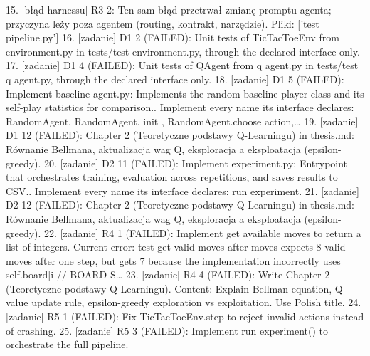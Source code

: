 \documentclass[conference]{IEEEtran}
\begin{document}
15. [błąd harnessu] R3 2: Ten sam błąd przetrwał zmianę promptu agenta; przyczyna leży poza agentem (routing, kontrakt, narzędzie). Pliki: ['test pipeline.py']
16. [zadanie] D1 2 (FAILED): Unit tests of TicTacToeEnv from environment.py in tests/test environment.py, through the declared interface only.
17. [zadanie] D1 4 (FAILED): Unit tests of QAgent from q agent.py in tests/test q agent.py, through the declared interface only.
18. [zadanie] D1 5 (FAILED): Implement baseline agent.py: Implements the random baseline player class and its self-play statistics for comparison.. Implement every name its interface declares: RandomAgent, RandomAgent. init , RandomAgent.choose action,…
19. [zadanie] D1 12 (FAILED): Chapter 2 (Teoretyczne podstawy Q-Learningu) in thesis.md: Równanie Bellmana, aktualizacja wag Q, eksploracja a eksploatacja (epsilon-greedy).
20. [zadanie] D2 11 (FAILED): Implement experiment.py: Entrypoint that orchestrates training, evaluation across repetitions, and saves results to CSV.. Implement every name its interface declares: run experiment.
21. [zadanie] D2 12 (FAILED): Chapter 2 (Teoretyczne podstawy Q-Learningu) in thesis.md: Równanie Bellmana, aktualizacja wag Q, eksploracja a eksploatacja (epsilon-greedy).
22. [zadanie] R4 1 (FAILED): Implement get available moves to return a list of integers. Current error: test get valid moves after moves expects 8 valid moves after one step, but gets 7 because the implementation incorrectly uses self.board[i // BOARD S…
23. [zadanie] R4 4 (FAILED): Write Chapter 2 (Teoretyczne podstawy Q-Learningu). Content: Explain Bellman equation, Q-value update rule, epsilon-greedy exploration vs exploitation. Use Polish title.
24. [zadanie] R5 1 (FAILED): Fix TicTacToeEnv.step to reject invalid actions instead of crashing.
25. [zadanie] R5 3 (FAILED): Implement run experiment() to orchestrate the full pipeline.

\nocite{*}


\end{document}
